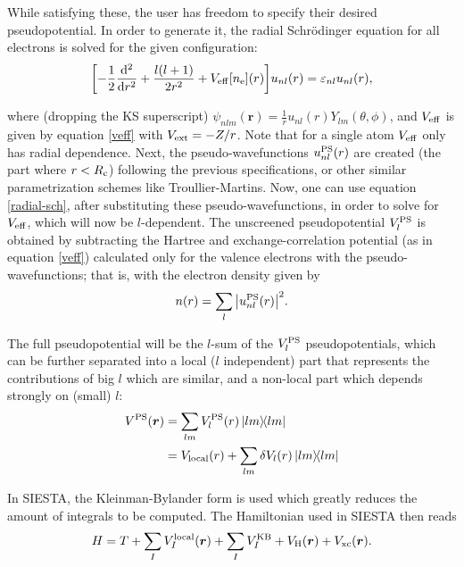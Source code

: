 While satisfying these, the user has freedom to specify their desired pseudopotential. In order to generate it, the radial Schrödinger equation for all electrons is solved for the given configuration:
\begin{equation}
\label{radial-sch}
\qty[-\frac 1 2 \frac{\mathrm{d}{^2}}{\mathrm{d}{r^2}}+\frac{l(l+1)}{2r^2}+V_{\mathrm{eff}}[n_{\mathrm{e}}](r)]u_{nl}(r)=\varepsilon_{nl}u_{nl}(r),
\end{equation}

where (dropping the KS superscript) \(\psi_{nlm}(\bm r)=\frac 1 r u_{nl}(r)Y_{lm}(\theta,\phi)\), and \(V_{\mathrm{eff}}\) is given by equation \ref{veff} with \(V_{\mathrm{ext}}=-Z/r\). Note that for a single atom \(V_{\mathrm{eff}}\) only has radial dependence. Next, the pseudo-wavefunctions \(u_{nl}^{\mathrm{PS}}(r)\) are created (the part where \(r < R_{\mathrm{c}}\)) following the previous specifications, or other similar parametrization schemes like Troullier-Martins\parencite{Troullier1991}. Now, one can use equation \ref{radial-sch}, after substituting these pseudo-wavefunctions, in order to solve for \(V_{\mathrm{eff}}\), which will now be \(l\)-dependent. The unscreened pseudopotential \(V^{\mathrm{PS}}_l\) is obtained by subtracting the Hartree and exchange-correlation potential (as in equation \ref{veff}) calculated only for the valence electrons with the pseudo-wavefunctions; that is, with the electron density given by
\begin{equation}
n(r)=\sum_{l}\abs{u_{nl}^{\mathrm{PS}}(r)}^2.
\end{equation}

The full pseudopotential will be the \(l\)-sum of the \(V^{\mathrm{PS}}_l\) pseudopotentials, which can be further separated into a local (\(l\) independent) part that represents the contributions of big \(l\) which are similar, and a non-local part which depends strongly on (small) \(l\):
\begin{equation}
\begin{split}
V^{\mr{PS}}(\bm r) &= \sum_{lm}V_l^{\mr{PS}}(r)\dyad{lm}\\
&=V_{\mr{local}}(r)+\sum_{lm}\delta V_l(r)\dyad{lm}
\end{split}
\end{equation}

In SIESTA, the Kleinman-Bylander form\parencite{Kleinman1982} is used which greatly reduces the amount of integrals to be computed. The Hamiltonian used in SIESTA then reads
\begin{equation}
\label{hsiesta}
	H=T+\sum_{I} V_{I}^{\mathrm{local}}(\bm{r})+\sum_{I} V_{I}^{\mathrm{KB}}+V_{\mathrm{H}}(\bm{r})+V_{\mathrm{xc}}(\bm{r}).
\end{equation}

